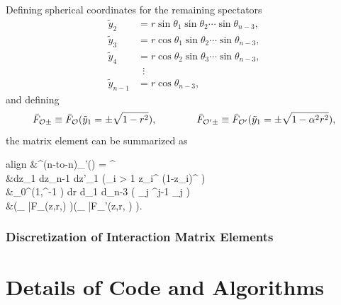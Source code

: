 \begin{subappendices}
Defining spherical coordinates for the remaining spectators \begin{equation}
	\begin{aligned}
		\tilde{y}_2 &= r \sin \theta_1 \sin \theta_2 \dotsb \sin \theta_{n-3}, \\
		\tilde{y}_3 &= r \cos \theta_1 \sin \theta_2 \dotsb \sin \theta_{n-3}, \\
		\tilde{y}_4 &= r \cos \theta_2 \sin \theta_3 \dotsb \sin \theta_{n-3}, \\
		&\, \, \, \vdots \\
		\tilde{y}_{n-1} &= r \cos \theta_{n-3},
	\end{aligned}
\end{equation} and defining \begin{equation}
	\bar{F}_{{\cal O} \pm} \equiv \bar{F}_{{\cal O}}(\tilde{y}_1 = \pm \sqrt{1-r^2}),\quad\quad\quad\quad \bar{F}_{{\cal O}' \pm} \equiv \bar{F}_{{\cal O}'}(\tilde{y}_1 = \pm \sqrt{1-\alpha^2 r^2}),
\end{equation} the matrix element can be summarized as \begin{empheq}[box=\fbox]{align}
			&\Mcal^{(n\textrm{-to-}n)}_{\Ocal \Ocal'}(\alpha) =   \alpha^{}  \nonumber \\
			&\times \int dz_1 \dotsb dz_{n-1} dz'_1  \left(\prod_{i > 1} z_i^{} (1-z_i)^{} \right) \nonumber \\
			&\times \int_0^{\min \left(1,\alpha^{-1} \right)} dr \int d\theta_1 \dotsb d\theta_{n-3} \left( \prod_j \sin^{j-1} \theta_j \right)  \nonumber \\
			&\times \left(\sum_{\pm} \bar{F}_{\Ocal}(z,r,\theta) \right)\left(\sum_{\pm} \bar{F}_{\Ocal'}(z,\alpha r, \theta) \right).
		\end{empheq}

\subsubsection{Discretization of Interaction Matrix Elements}\label{sec:discretint}



\section{Details of Code and Algorithms}
\label{sec:code}


\end{subappendices}
